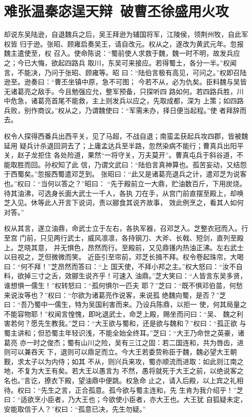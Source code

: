 \chapter{难张温秦宓逞天辩~破曹丕徐盛用火攻}

却说东吴陆逊，自退魏兵之后，吴王拜逊为辅国将军，江陵侯，领荆州牧，自此军权皆
归于逊。张昭、顾雍启奏吴王，请自改元。权从之，遂改为黄武元年。忽报魏主遣使至，权
召入。使命陈说：“蜀前使人求救于魏，魏一时不明，故发兵应之；今已大悔，欲起四路兵
取川，东吴可来接应。若得蜀土，各分一半。”权闻言，不能决，乃问于张昭、顾雍等。昭
曰：“陆伯言极有高见，可问之。”权即召陆逊至。逊奏曰：“曹丕坐镇中原，急不可图；
今若不从，必为仇矣。臣料魏与吴皆无诸葛亮之敌手。今且勉强应允，整军预备，只探听四
路如何。若四路兵胜，川中危急，诸葛亮首尾不能救，主上则发兵以应之，先取成都，深为
上策；如四路兵败，别作商议。”权从之，乃谓魏使曰：“军需未办，择日便当起程。”使
者拜辞而去。

权令人探得西番兵出西平关，见了马超，不战自退；南蛮孟获起兵攻四郡，皆被魏延用
疑兵计杀退回洞去了；上庸孟达兵至半路，忽然染病不能行；曹真兵出阳平关，赵子龙拒住
各处险道，果然“一将守关，万夫莫开”。曹真屯兵于斜谷道，不能取胜而回。孙权知了此
信，乃谓文武曰：“陆伯言真神算也。孤苦妄动，又结怨于西蜀矣。”忽报西蜀遣邓芝到。
张昭曰：“此又是诸葛亮退兵之计，遣邓芝为说客也。”权曰：“当何以答之？”昭曰：
“先于殿前立一大鼎，贮油数百斤，下用炭烧。待其油沸，可选身长面大武士一千人，各执
刀在手，从宫门前直摆至殿上，却唤芝入见。休等此人开言下说词，责以郦食其说齐故事，
效此例烹之，看其人如何对答。”

权从其言，遂立油鼎，命武士立于左右，各执军器，召邓芝入。芝整衣冠而入。行至宫
门前，只见两行武士，威风凛凛，各持钢刀、大斧、长戟、短剑，直列至殿上。芝晓其意，
并无惧色，昂然而行。至殿前，又见鼎镬内热油正沸。左右武士以目视之，芝但微微而笑。
近臣引至帘前，邓芝长揖不拜。权令卷起珠帘，大喝曰：“何不拜！”芝昂然而答曰：“上
国天使，不拜小邦之主。”权大怒曰：“汝不自料，欲掉三寸之舌，效郦生说齐乎！可速入
油鼎。”芝大笑曰：“人皆言东吴多贤，谁想惧一儒生！”权转怒曰：“孤何惧尔一匹夫
耶？”芝曰：“既不惧邓伯苗，何愁来说汝等也？”权曰：“尔欲为诸葛亮作说客，来说孤
绝魏向蜀，是否？”芝曰：“吾乃蜀中一儒生，特为吴国利害而来。乃设兵陈鼎，以拒一
使，何其局量之不能容物耶！”权闻言惶愧，即叱退武士，命芝上殿，赐坐而问曰：“吴、
魏之利害若何？愿先生教我。”芝曰：“大王欲与蜀和，还是欲与魏和？”权曰：“孤正欲
与蜀主讲和；但恐蜀主年轻识浅，不能全始全终耳。”芝曰：“大王乃命世之英豪，诸葛亮
亦一时之俊杰；蜀有山川之险，吴有三江之固：若二国连和，共为唇齿，进则可以兼吞天
下，退则可以鼎足而立。今大王若委贽称臣于魏，魏必望大王朝觐，求太子以为内侍；如其
不从，则兴兵来攻，蜀亦顺流而进取：如此则江南之地，不复为大王有矣。若大王以愚言为
不然，愚将就死于大王之前，以绝说客之名也。”言讫，撩衣下殿，望油鼎中便跳。权急命
止之，请入后殿，以上宾之礼相待。权曰：“先生之言，正合孤意。孤今欲与蜀主连和，先
生肯为我介绍乎！”芝曰：“适欲烹小臣者，乃大王也；今欲使小臣者，亦大王也。大王犹
自狐疑未定，安能取信于人？”权曰：“孤意已决，先生勿疑。”

